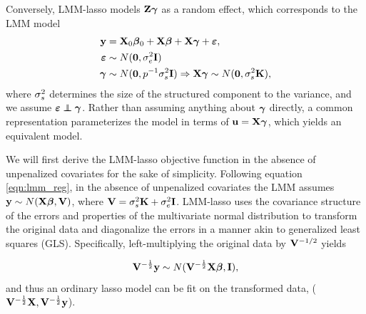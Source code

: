 Conversely, LMM-lasso models $\mathbf{Z}\boldsymbol{\gamma}$ as a random effect, which corresponds to the LMM model
\begin{equation}
  \begin{aligned}
    \label{eqn:lmm_reg}
    \mathbf{y} &= \mathbf{X}_0\boldsymbol{\beta}{}_0 + \mathbf{X}\boldsymbol{\beta}{} + \mathbf{X}\boldsymbol{\gamma}+ \boldsymbol{\varepsilon}{}, \\
    \boldsymbol{\varepsilon}{} &\sim N(\boldsymbol{0}, \sigma^2_e \mathbf{I}) \\
 \boldsymbol{\gamma} &\sim N(\boldsymbol{0}, p^{-1} \sigma^2_s \mathbf{I}) \Rightarrow \mathbf{X} \boldsymbol{\gamma} \sim N(\boldsymbol{0}, \sigma^2_s \mathbf{K}),
  \end{aligned}
\end{equation}
where $\sigma^2_s$ determines the size of the structured component to the variance, and we assume $\beps \independent \bgamma$. Rather than assuming anything about $\boldsymbol{\gamma}$ directly, a common representation parameterizes the model in terms of $\mathbf{u}=\mathbf{X}\boldsymbol{\gamma}$, which yields an equivalent model. 

We will first derive the LMM-lasso objective function in the absence of unpenalized covariates for the sake of simplicity. Following equation \eqref{eqn:lmm_reg}, in the absence of unpenalized covariates the LMM assumes $\mathbf{y} \sim N(\mathbf{X} \boldsymbol{\beta}{}, \mathbf{V})$, where $\mathbf{V} = \sigma^2_s \textbf{K} + \sigma^2_e \textbf{I}$. LMM-lasso uses the covariance structure of the errors and properties of the multivariate normal distribution to transform the original data and diagonalize the errors in a manner akin to generalized least squares (GLS). Specifically, left-multiplying the original data by $\mathbf{V}^{-1/2}$ yields 

\begin{equation}
\label{eqn:rtY_distn}
\mathbf{V}^{-\frac{1}{2}}\mathbf{y} \sim N(\mathbf{V}^{-\frac{1}{2}} \mathbf{X} \boldsymbol{\beta}{}, \mathbf{I}),
\end{equation}
and thus an ordinary lasso model can be fit on the transformed data, ($\mathbf{V}^{-\frac{1}{2}}\mathbf{X}, \mathbf{V}^{-\frac{1}{2}}\mathbf{y}$). 

